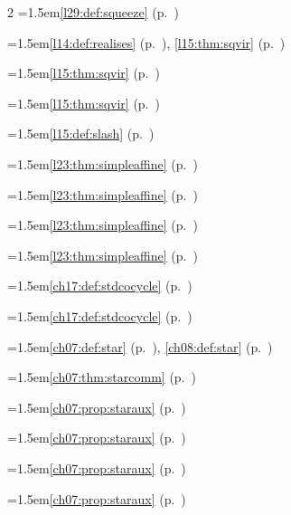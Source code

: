 \begin{multicols}{2}
\hangindent=1.5em\quad \ref{l29:def:squeeze} (p.~\pageref{l29:def:squeeze})\par
\hangindent=1.5em\quad \ref{l14:def:realises} (p.~\pageref{l14:def:realises}), \ref{l15:thm:sqvir} (p.~\pageref{l15:thm:sqvir})\par
\hangindent=1.5em\quad \ref{l15:thm:sqvir} (p.~\pageref{l15:thm:sqvir})\par
\hangindent=1.5em\quad \ref{l15:thm:sqvir} (p.~\pageref{l15:thm:sqvir})\par
\hangindent=1.5em\quad \ref{l15:def:slash} (p.~\pageref{l15:def:slash})\par
\hangindent=1.5em\quad \ref{l23:thm:simpleaffine} (p.~\pageref{l23:thm:simpleaffine})\par
\hangindent=1.5em\quad \ref{l23:thm:simpleaffine} (p.~\pageref{l23:thm:simpleaffine})\par
\hangindent=1.5em\quad \ref{l23:thm:simpleaffine} (p.~\pageref{l23:thm:simpleaffine})\par
\hangindent=1.5em\quad \ref{l23:thm:simpleaffine} (p.~\pageref{l23:thm:simpleaffine})\par
\hangindent=1.5em\quad \ref{ch17:def:stdcocycle} (p.~\pageref{ch17:def:stdcocycle})\par
\hangindent=1.5em\quad \ref{ch17:def:stdcocycle} (p.~\pageref{ch17:def:stdcocycle})\par
\hangindent=1.5em\quad \ref{ch07:def:star} (p.~\pageref{ch07:def:star}), \ref{ch08:def:star} (p.~\pageref{ch08:def:star})\par
\hangindent=1.5em\quad \ref{ch07:thm:starcomm} (p.~\pageref{ch07:thm:starcomm})\par
\hangindent=1.5em\quad \ref{ch07:prop:staraux} (p.~\pageref{ch07:prop:staraux})\par
\hangindent=1.5em\quad \ref{ch07:prop:staraux} (p.~\pageref{ch07:prop:staraux})\par
\hangindent=1.5em\quad \ref{ch07:prop:staraux} (p.~\pageref{ch07:prop:staraux})\par
\hangindent=1.5em\quad \ref{ch07:prop:staraux} (p.~\pageref{ch07:prop:staraux})\par

\end{multicols}
